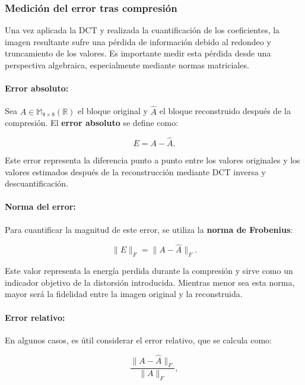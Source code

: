 \documentclass[8pt,a4paper]{article}
\theoremstyle{definition}
\theoremstyle{remark}
\begin{document}
\begin{multicols}{2}
            \subsubsection{Medición del error tras compresión}
    
            Una vez aplicada la DCT y realizada la cuantificación de los coeficientes, la imagen resultante sufre una pérdida de información debido al redondeo y truncamiento de los valores. Es importante medir esta pérdida desde una perspectiva algebraica, especialmente mediante normas matriciales.
            
            \paragraph{Error absoluto:} Sea \( A \in \mathbb{M}_{8 \times 8}(\mathbb{R}) \) el bloque original y \( \hat{A} \) el bloque reconstruido después de la compresión. El \textbf{error absoluto} se define como:
            
            \[
            E = A - \hat{A}.
            \]
            
            Este error representa la diferencia punto a punto entre los valores originales y los valores estimados después de la reconstrucción mediante DCT inversa y descuantificación.
            
            \paragraph{Norma del error:} Para cuantificar la magnitud de este error, se utiliza la \textbf{norma de Frobenius}:
            
            \[
            \|E\|_F = \|A - \hat{A}\|_F.
            \]
            
            Este valor representa la energía perdida durante la compresión y sirve como un indicador objetivo de la distorsión introducida. Mientras menor sea esta norma, mayor será la fidelidad entre la imagen original y la reconstruida.
            
            \paragraph{Error relativo:} En algunos casos, es útil considerar el error relativo, que se calcula como:
            
            \[
            \frac{\|A - \hat{A}\|_F}{\|A\|_F},
            \]
            

\end{multicols}
\end{document}

